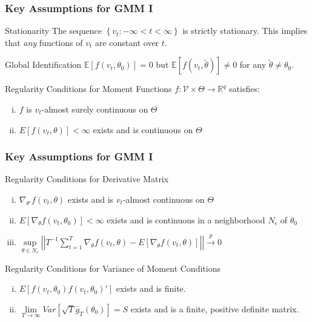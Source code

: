 \begin{frame}
  \frametitle{Key Assumptions for GMM I}

  \begin{block}{Stationarity}
    The sequence $\left\{ v_t\colon -\infty < t < \infty \right\}$ is strictly stationary.
    This implies that \emph{any} functions of $v_t$ are constant over $t$.
  \end{block}

  \begin{block}{Global Identification}
    $\mathbb{E}[f(v_t,\theta_0)]=0$ but $\mathbb{E}[f(v_t, \widetilde{\theta})] \neq 0$ for any $\widetilde{\theta} \neq \theta_0$.
  \end{block}

  \begin{block}{Regularity Conditions for Moment Functions}
$f\colon \mathcal{V}\times \Theta \rightarrow \mathbb{R}^q$ satisfies: 
	\begin{enumerate}[(i)]
		\item $f$ is $v_t$-almost surely continuous on $\Theta$
		\item $E[f(v_t, \theta)]<\infty$ exists and is continuous on $\Theta$
	\end{enumerate}
  \end{block}
\end{frame}
\begin{frame}
  \frametitle{Key Assumptions for GMM I}
  \begin{block}{Regularity Conditions for Derivative Matrix}
	\begin{enumerate}[(i)]
		\item $\nabla_{\theta'} f(v_t, \theta)$ exists and is $v_t$-almost continuous on $\Theta$ 
		\item $E[\nabla_{\theta}f(v_t, \theta_0)]<\infty$ exists and is continuous in a  neighborhood $N_\epsilon$ of $\theta_0$
		\item $\underset{\theta \in N_\epsilon}{\sup}\left| \left| T^{-1} \sum_{t=1}^T \nabla_\theta f(v_t, \theta) - E[\nabla_\theta f(v_t, \theta)]\right|\right| \overset{p}{\rightarrow} 0$
	\end{enumerate}
  \end{block}

  \begin{block}{Regularity Conditions for Variance of Moment Conditions}
\begin{enumerate}[(i)]
	\item $E[f(v_t, \theta_0)f(v_t, \theta_0)']$ exists and is finite.
	\item $\underset{T\rightarrow \infty}{\lim} Var\left[\sqrt{T}\bar{g}_T(\theta_0)\right]=S$ exists and is a finite, positive definite matrix.
\end{enumerate}
  \end{block}

\end{frame}

